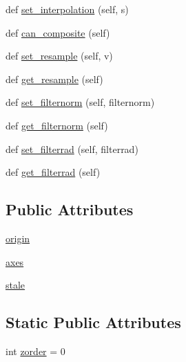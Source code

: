 \begin{DoxyCompactItemize}
\item 
def \hyperlink{classmatplotlib_1_1image_1_1__ImageBase_a6378a7f0017f9b7c0b5de5ca21dcfb5d}{set\+\_\+interpolation} (self, s)
\item 
def \hyperlink{classmatplotlib_1_1image_1_1__ImageBase_a481a8acf2921a2547de1ca409ff208c2}{can\+\_\+composite} (self)
\item 
def \hyperlink{classmatplotlib_1_1image_1_1__ImageBase_a423cd6d2a89db540b15e4646229e588f}{set\+\_\+resample} (self, v)
\item 
def \hyperlink{classmatplotlib_1_1image_1_1__ImageBase_ada4c02e73f55a8258134014db4ef2af0}{get\+\_\+resample} (self)
\item 
def \hyperlink{classmatplotlib_1_1image_1_1__ImageBase_aaf5954386fd1f0190880d51de66885d5}{set\+\_\+filternorm} (self, filternorm)
\item 
def \hyperlink{classmatplotlib_1_1image_1_1__ImageBase_a9234322d104d47fe009b887bd0d10692}{get\+\_\+filternorm} (self)
\item 
def \hyperlink{classmatplotlib_1_1image_1_1__ImageBase_a203619a893439987530488669fc6ad44}{set\+\_\+filterrad} (self, filterrad)
\item 
def \hyperlink{classmatplotlib_1_1image_1_1__ImageBase_a689f303a4a281635abff6b0f29921293}{get\+\_\+filterrad} (self)
\end{DoxyCompactItemize}
\subsection*{Public Attributes}
\begin{DoxyCompactItemize}
\item 
\hyperlink{classmatplotlib_1_1image_1_1__ImageBase_aebc786349e152a9dc981ffde5bc39795}{origin}
\item 
\hyperlink{classmatplotlib_1_1image_1_1__ImageBase_a64950607e4dc75dade3a971f14c874fb}{axes}
\item 
\hyperlink{classmatplotlib_1_1image_1_1__ImageBase_afa4761bf7ee5af318e64311c4f0349d9}{stale}
\end{DoxyCompactItemize}
\subsection*{Static Public Attributes}
\begin{DoxyCompactItemize}
\item 
int \hyperlink{classmatplotlib_1_1image_1_1__ImageBase_a8f3acf11a85ca1a4bb68009e2905a3a9}{zorder} = 0
\end{DoxyCompactItemize}


